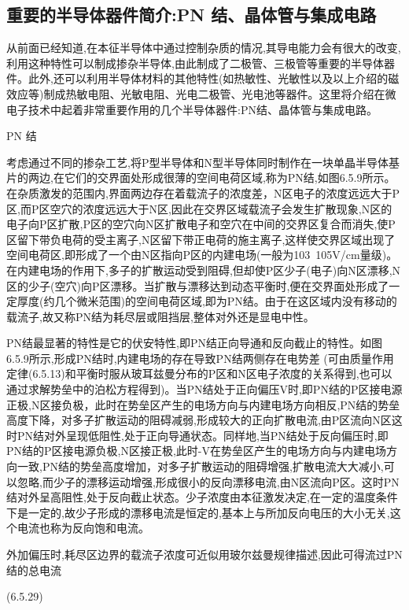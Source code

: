 \subsection{重要的半导体器件简介:PN 结、晶体管与集成电路}

从前面已经知道,在本征半导体中通过控制杂质的情况,其导电能力会有很大的改变,利用这种特性可以制成掺杂半导体,由此制成了二极管、三极管等重要的半导体器件。此外,还可以利用半导体材料的其他特性(如热敏性、光敏性以及以上介绍的磁效应等)制成热敏电阻、光敏电阻、光电二极管、光电池等器件。这里将介绍在微电子技术中起着非常重要作用的几个半导体器件:PN结、晶体管与集成电路。

PN 结

考虑通过不同的掺杂工艺,将P型半导体和N型半导体同时制作在一块单晶半导体基片的两边,在它们的交界面处形成很薄的空间电荷区域,称为PN结,如图6.5.9所示。在杂质激发的范围内,界面两边存在着载流子的浓度差，N区电子的浓度远远大于P区,而P区空穴的浓度远远大于N区,因此在交界区域载流子会发生扩散现象,N区的电子向P区扩散,P区的空穴向N区扩散电子和空穴在中间的交界区复合而消失,使P区留下带负电荷的受主离子,N区留下带正电荷的施主离子,这样使交界区域出现了空间电荷区,即形成了一个由N区指向P区的内建电场(一般为103~105V/cm量级)。在内建电场的作用下,多子的扩散运动受到阻碍,但却使P区少子(电子)向N区漂移,N区的少子(空穴)向P区漂移。当扩散与漂移达到动态平衡时,便在交界面处形成了一定厚度(约几个微米范围)的空间电荷区域,即为PN结。由于在这区域内没有移动的载流子,故又称PN结为耗尽层或阻挡层,整体对外还是显电中性。



PN结最显著的特性是它的伏安特性,即PN结正向导通和反向截止的特性。如图6.5.9所示,形成PN结时,内建电场的存在导致PN结两侧存在电势差 (可由质量作用定律(6.5.13)和平衡时服从玻耳兹曼分布的P区和N区电子浓度的关系得到,也可以通过求解势垒中的泊松方程得到)。当PN结处于正向偏压V时,即PN结的P区接电源正极,N区接负极，此时在势垒区产生的电场方向与内建电场方向相反,PN结的势垒高度下降，对多子扩散运动的阻碍减弱,形成较大的正向扩散电流,由P区流向N区这时PN结对外呈现低阻性,处于正向导通状态。同样地,当PN结处于反向偏压时,即PN结的P区接电源负极,N区接正极,此时-V在势垒区产生的电场方向与内建电场方向一致,PN结的势垒高度增加，对多子扩散运动的阻碍增强,扩散电流大大减小,可以忽略,而少子的漂移运动增强,形成很小的反向漂移电流,由N区流向P区。这时PN结对外呈高阻性,处于反向截止状态。少子浓度由本征激发决定,在一定的温度条件下是一定的,故少子形成的漂移电流是恒定的,基本上与所加反向电压的大小无关,这个电流也称为反向饱和电流。

外加偏压时,耗尽区边界的载流子浓度可近似用玻尔兹曼规律描述,因此可得流过PN结的总电流

 	(6.5.29)

